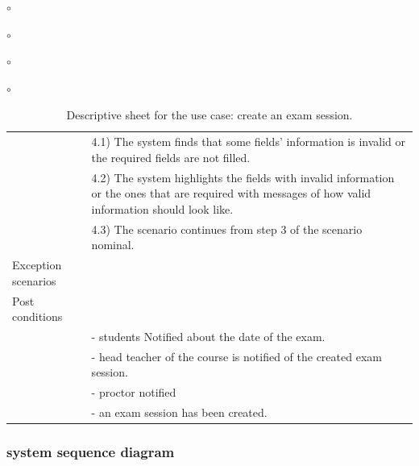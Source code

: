 \documentclass[]{uc2pfecaneva}
\begin{document}
\begin{list}{$\circ$}{}
\begin{list}{$\circ$}{}
\begin{list}{$\circ$}{}
\begin{list}{$\circ$}{}
\begin{table}[t]
\begin{tabularx}{\textwidth}{|l|X|}
            & \hspace{4mm}4.1) The system finds that some fields' information is invalid or the required fields are not filled.                                                 \\
            & \hspace{4mm}4.2) The system highlights the fields with invalid information or the ones that are required with messages of how valid information should look like. \\
            & \hspace{4mm}4.3) The scenario continues from step 3 of the scenario nominal.                                                                                      \\ \hline
            Exception scenarios   &                                                                                                                                                                   \\ \hline
            Post conditions       &                                                                                                                                                                   \\
            & - students Notified about the date of the exam.                                                                                                                   \\
            & - head teacher of the course is notified of the created exam session.                                                                                             \\
            & - proctor notified                                                                                           \\
            & - an exam session has been created.                                                                                                                               \\ \hline
        \end{tabularx}
        \caption{Descriptive sheet for the use case: create an exam session.}
        \label{table:2}
    \end{table}
    \clearpage

    \subsubsection{system sequence diagram}
    \begin{figure}[h]


\end{figure}
\end{list}
\end{list}
\end{list}
\end{list}
\end{document}
